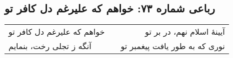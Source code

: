 \begin{center}
\section*{رباعی شماره ۷۳: خواهم که علیرغم دل کافر تو}
\label{sec:073}
\begin{longtable}{l p{0.5cm} r}
خواهم که علیرغم دل کافر تو
&&
آیینهٔ اسلام نهم، در بر تو
\\
آنگه ز تجلی رخت، بنمایم
&&
نوری که به طور یافت پیغمبر تو
\\
\end{longtable}
\end{center}
